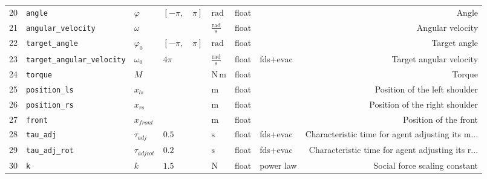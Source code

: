 \begin{table}[H]
\begin{tabularx}{1.0\linewidth}{rllllllR}
20 &                    \verb|angle| &        $\varphi$ &  $\left [ - \pi, \quad \pi\right ]$ &               $\mathrm{rad}$ &       float &            &                                              Angle \\
21 &         \verb|angular_velocity| &         $\omega$ &                                     &     $\mathrm{\frac{rad}{s}}$ &       float &            &                                   Angular velocity \\
22 &             \verb|target_angle| &    $\varphi_{0}$ &  $\left [ - \pi, \quad \pi\right ]$ &               $\mathrm{rad}$ &       float &            &                                       Target angle \\
23 &  \verb|target_angular_velocity| &     $\omega_{0}$ &                             $4 \pi$ &     $\mathrm{\frac{rad}{s}}$ &       float &   fds+evac &                            Target angular velocity \\
24 &                   \verb|torque| &              $M$ &                                     &              $\mathrm{N\,m}$ &       float &            &                                             Torque \\
25 &              \verb|position_ls| &         $x_{ls}$ &                                     &                 $\mathrm{m}$ &       float &            &                      Position of the left shoulder \\
26 &              \verb|position_rs| &         $x_{rs}$ &                                     &                 $\mathrm{m}$ &       float &            &                     Position of the right shoulder \\
27 &                    \verb|front| &      $x_{front}$ &                                     &                 $\mathrm{m}$ &       float &            &                              Position of the front \\
28 &                  \verb|tau_adj| &     $\tau_{adj}$ &                               $0.5$ &                 $\mathrm{s}$ &       float &   fds+evac &  Characteristic time for agent adjusting its  m... \\
29 &              \verb|tau_adj_rot| &  $\tau_{adjrot}$ &                               $0.2$ &                 $\mathrm{s}$ &       float &   fds+evac &  Characteristic time for agent adjusting its  r... \\
30 &                        \verb|k| &              $k$ &                               $1.5$ &                 $\mathrm{N}$ &       float &  power law &                      Social force scaling constant \\

\end{tabularx}
\end{table}

